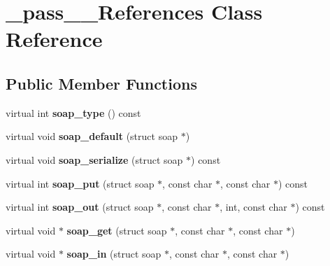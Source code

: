 \hypertarget{class__pass____References}{
\section{\_\-pass\_\-\_\-References Class Reference}
\label{class__pass____References}
}
\subsection*{Public Member Functions}
\begin{DoxyCompactItemize}
\item 
\hypertarget{class__pass____References_ab1c18f88f1c6fdd525b9649c5dcbfa8a}{
virtual int {\bfseries soap\_\-type} () const }
\label{class__pass____References_ab1c18f88f1c6fdd525b9649c5dcbfa8a}

\item 
\hypertarget{class__pass____References_a57608df8b52964f5f7b703c3aa6a0b35}{
virtual void {\bfseries soap\_\-default} (struct soap $\ast$)}
\label{class__pass____References_a57608df8b52964f5f7b703c3aa6a0b35}

\item 
\hypertarget{class__pass____References_af7baf72aa770a46981ffc123782a4599}{
virtual void {\bfseries soap\_\-serialize} (struct soap $\ast$) const }
\label{class__pass____References_af7baf72aa770a46981ffc123782a4599}

\item 
\hypertarget{class__pass____References_a2e5434d8de0914a095dbf3aa5b5147c4}{
virtual int {\bfseries soap\_\-put} (struct soap $\ast$, const char $\ast$, const char $\ast$) const }
\label{class__pass____References_a2e5434d8de0914a095dbf3aa5b5147c4}

\item 
\hypertarget{class__pass____References_a3a48caae5d6af5f2db1060d163668e94}{
virtual int {\bfseries soap\_\-out} (struct soap $\ast$, const char $\ast$, int, const char $\ast$) const }
\label{class__pass____References_a3a48caae5d6af5f2db1060d163668e94}

\item 
\hypertarget{class__pass____References_a336e15209ef0097b3f1fb2e7f9074a17}{
virtual void $\ast$ {\bfseries soap\_\-get} (struct soap $\ast$, const char $\ast$, const char $\ast$)}
\label{class__pass____References_a336e15209ef0097b3f1fb2e7f9074a17}

\item 
\hypertarget{class__pass____References_a0e2a6bf0479f900ff2adfade7e6167ee}{
virtual void $\ast$ {\bfseries soap\_\-in} (struct soap $\ast$, const char $\ast$, const char $\ast$)}
\label{class__pass____References_a0e2a6bf0479f900ff2adfade7e6167ee}

\end{DoxyCompactItemize}
